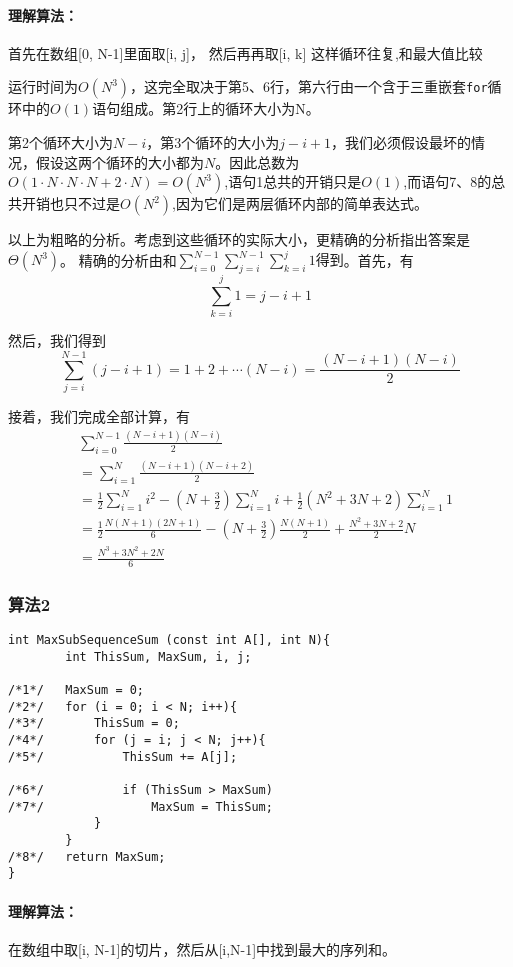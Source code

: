 \documentclass[utf8]{ctexbook}
\begin{document}
\paragraph{理解算法：} 首先在数组[0, N-1]里面取[i, j]， 然后再再取[i, k] 这样循环往复,和最大值比较


运行时间为$O(N^3)$，这完全取决于第5、6行，第六行由一个含于三重嵌套\verb|for|循环中的$O(1)$语句组成。第2行上的循环大小为N。

第2个循环大小为$N-i$，第3个循环的大小为$j-i+1$，我们必须假设最坏的情况，假设这两个循环的大小都为$N$。因此总数为$O(1\cdot N\cdot N \cdot N + 2 \cdot N) = O(N^3)$,语句1总共的开销只是$O(1)$,而语句7、8的总共开销也只不过是$O(N^2)$,因为它们是两层循环内部的简单表达式。

以上为粗略的分析。考虑到这些循环的实际大小，更精确的分析指出答案是$\Theta (N^3)$。 
精确的分析由和$\displaystyle{\sum_{i=0}^{N-1} \sum_{j=i}^{N-1} \sum_{k = i}^{j} 1得到}$。首先，有
\[
    \sum_{k=i}^{j} 1 = j - i +1
\]

然后，我们得到
\[
    \sum_{j=i}^{N-1} (j-i+1) = 1 + 2  + \cdots (N-i) = \frac{(N-i+1)(N-i)}{2}
\]

接着，我们完成全部计算，有
\begin{align*}
&\sum_{i = 0}^{N-1} \frac{(N-i+1)(N-i)}{2} \\
& = \sum_{i=1}^{N} \frac{(N-i+1)(N-i+2)}{2}\\ 
& = \frac 12 \sum_{i=1}^{N} i^2 - (N+\frac 32)\sum_{i=1}^{N} i +\frac 12 (N^2 + 3N +2)\sum_{i=1}^{N} 1\\ 
& = \frac 12 \frac{N(N+1)(2N+1)}{6} - (N+\frac 32)\frac{N(N+1)}{2}+ \frac{N^2 + 3N +2}{2}N\\ 
&=\frac{N^3 + 3N^2 + 2N}{6}
\end{align*}

\subsubsection{算法2}
\begin{lstlisting}
int MaxSubSequenceSum (const int A[], int N){
        int ThisSum, MaxSum, i, j;

/*1*/   MaxSum = 0;
/*2*/   for (i = 0; i < N; i++){
/*3*/       ThisSum = 0;
/*4*/       for (j = i; j < N; j++){
/*5*/           ThisSum += A[j];

/*6*/           if (ThisSum > MaxSum)
/*7*/               MaxSum = ThisSum;
            }
        }
/*8*/   return MaxSum;
}
\end{lstlisting}
\paragraph{理解算法：} 在数组中取[i, N-1]的切片，然后从[i,N-1]中找到最大的序列和。
\end{document}
